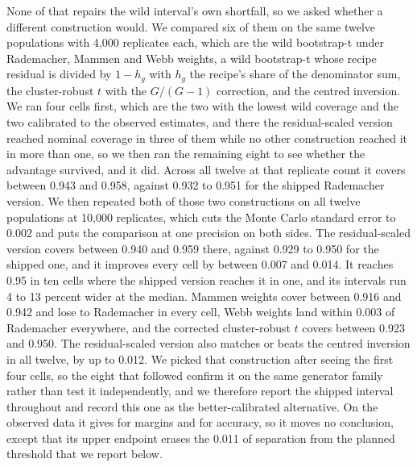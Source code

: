 None of that repairs the wild interval's own shortfall, so we asked whether a different construction would. We compared six of them on the same twelve populations with 4,000 replicates each, which are the wild bootstrap-t under Rademacher, Mammen and Webb weights, a wild bootstrap-t whose recipe residual is divided by $1-h_g$ with $h_g$ the recipe's share of the denominator sum, the cluster-robust $t$ with the $G/(G-1)$ correction, and the centred inversion. We ran four cells first, which are the two with the lowest wild coverage and the two calibrated to the observed estimates, and there the residual-scaled version reached nominal coverage in three of them while no other construction reached it in more than one, so we then ran the remaining eight to see whether the advantage survived, and it did. Across all twelve at that replicate count it covers between 0.943 and 0.958, against 0.932 to 0.951 for the shipped Rademacher version. We then repeated both of those two constructions on all twelve populations at 10,000 replicates, which cuts the Monte Carlo standard error to 0.002 and puts the comparison at one precision on both sides. The residual-scaled version covers between 0.940 and 0.959 there, against 0.929 to 0.950 for the shipped one, and it improves every cell by between 0.007 and 0.014. It reaches 0.95 in ten cells where the shipped version reaches it in one, and its intervals run 4 to 13 percent wider at the median. Mammen weights cover between 0.916 and 0.942 and lose to Rademacher in every cell, Webb weights land within 0.003 of Rademacher everywhere, and the corrected cluster-robust $t$ covers between 0.923 and 0.950. The residual-scaled version also matches or beats the centred inversion in all twelve, by up to 0.012. We picked that construction after seeing the first four cells, so the eight that followed confirm it on the same generator family rather than test it independently, and we therefore report the shipped interval throughout and record this one as the better-calibrated alternative. On the observed data it gives  for margins and  for accuracy, so it moves no conclusion, except that its upper endpoint erases the 0.011 of separation from the planned threshold that we report below.

